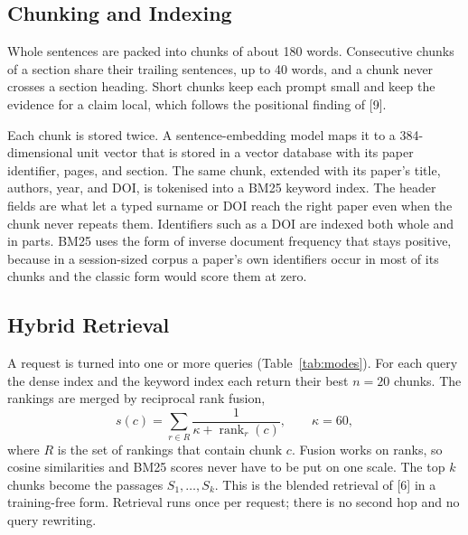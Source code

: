 \documentclass[10pt,twocolumn,letterpaper]{article}
\begin{document}
\subsection{Chunking and Indexing}
Whole sentences are packed into chunks of about 180 words. Consecutive chunks of a section share their trailing sentences, up to 40 words, and a chunk never crosses a section heading. Short chunks keep each prompt small and keep the evidence for a claim local, which follows the positional finding of [9].

Each chunk is stored twice. A sentence-embedding model maps it to a 384-dimensional unit vector that is stored in a vector database with its paper identifier, pages, and section. The same chunk, extended with its paper's title, authors, year, and DOI, is tokenised into a BM25 keyword index. The header fields are what let a typed surname or DOI reach the right paper even when the chunk never repeats them. Identifiers such as a DOI are indexed both whole and in parts. BM25 uses the form of inverse document frequency that stays positive, because in a session-sized corpus a paper's own identifiers occur in most of its chunks and the classic form would score them at zero.

\subsection{Hybrid Retrieval}
A request is turned into one or more queries (Table~\ref{tab:modes}). For each query the dense index and the keyword index each return their best $n=20$ chunks. The rankings are merged by reciprocal rank fusion,
\begin{equation}
s(c)=\sum_{r\in R}\frac{1}{\kappa+\operatorname{rank}_r(c)},\qquad \kappa=60,
\label{eq:rrf}
\end{equation}
where $R$ is the set of rankings that contain chunk $c$. Fusion works on ranks, so cosine similarities and BM25 scores never have to be put on one scale. The top $k$ chunks become the passages $S_1,\ldots,S_k$. This is the blended retrieval of [6] in a training-free form. Retrieval runs once per request; there is no second hop and no query rewriting.
\end{document}

